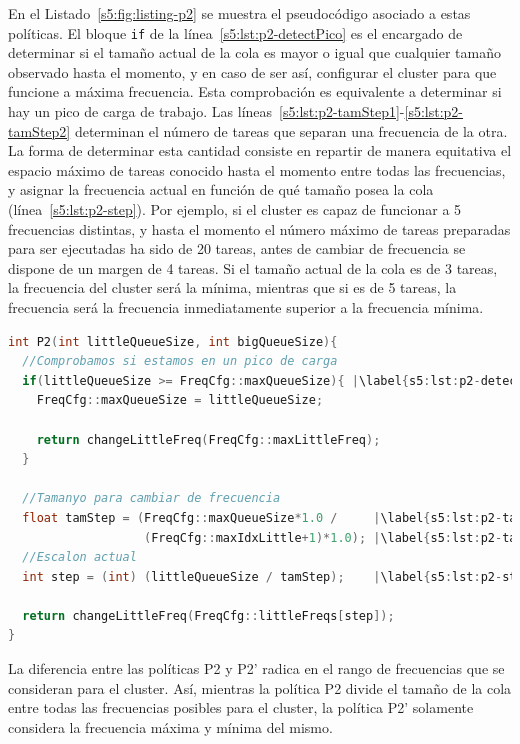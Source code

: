 En el Listado~\ref{s5:fig:listing-p2} se muestra el pseudocódigo
asociado a estas políticas. El bloque \texttt{if} de la
línea~\ref{s5:lst:p2-detectPico} es el encargado de determinar si el tamaño
actual de la cola es mayor o igual que cualquier tamaño observado hasta el momento, y
en caso de ser así, configurar el cluster para que funcione a máxima
frecuencia. Esta comprobación es equivalente a determinar si hay un pico de carga de
trabajo. Las líneas~\ref{s5:lst:p2-tamStep1}-\ref{s5:lst:p2-tamStep2}
determinan el número de tareas que separan una frecuencia de la otra. La
forma de determinar esta cantidad consiste en repartir de manera equitativa
el espacio máximo de tareas conocido hasta el momento entre todas las
frecuencias, y asignar la frecuencia actual en función de qué tamaño posea
la cola (línea~\ref{s5:lst:p2-step}). Por ejemplo, si el cluster es capaz
de funcionar a 5 frecuencias distintas, y hasta el momento el número
máximo de tareas preparadas para ser ejecutadas ha sido de 20 tareas, antes
de cambiar de frecuencia se dispone de un margen de 4 tareas. Si el tamaño
actual de la cola es de 3 tareas, la frecuencia del cluster será la mínima,
mientras que si es de 5 tareas, la frecuencia será la frecuencia
inmediatamente superior a la frecuencia mínima.

\begin{lstlisting}[float,language=C++,caption={Pseudocódigo para las políticas P2 y P2'.},label={s5:fig:listing-p2}]
int P2(int littleQueueSize, int bigQueueSize){      
  //Comprobamos si estamos en un pico de carga
  if(littleQueueSize >= FreqCfg::maxQueueSize){ |\label{s5:lst:p2-detectPico}|
    FreqCfg::maxQueueSize = littleQueueSize;

    return changeLittleFreq(FreqCfg::maxLittleFreq);
  }

  //Tamanyo para cambiar de frecuencia
  float tamStep = (FreqCfg::maxQueueSize*1.0 /     |\label{s5:lst:p2-tamStep1}|
                   (FreqCfg::maxIdxLittle+1)*1.0); |\label{s5:lst:p2-tamStep2}|
  //Escalon actual
  int step = (int) (littleQueueSize / tamStep);    |\label{s5:lst:p2-step}|

  return changeLittleFreq(FreqCfg::littleFreqs[step]);
}
\end{lstlisting}

La diferencia entre las políticas P2 y P2' radica en el rango de
frecuencias que se consideran para el cluster. Así, mientras la política P2
divide el tamaño de la cola entre todas las frecuencias posibles para el
cluster, la política P2' solamente considera la frecuencia máxima y mínima
del mismo.

